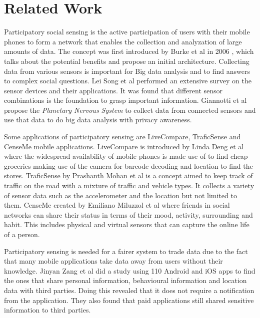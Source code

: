 \chapter{Related Work}

Participatory social sensing is the active participation of users with their mobile phones to form a network that enables the collection and analyzation of large amounts of data.
The concept was first introduced by Burke et al in 2006 \cite{burke2006participatory}, which talks about the potential benefits and propose an initial architecture. Collecting data from various sensors is important for Big data analysis and to find answers to complex social questions. Lei Song et al \cite{song2014health} performed an extensive survey on the sensor devices and their applications. It was found that different sensor combinations is the foundation to grasp important information. Giannotti et al \cite{giannotti2012planetary} propose the \textit{Planetary Nervous System} to collect data from connected sensors and use that data to do big data analysis with privacy awareness.

Some applications of participatory sensing are LiveCompare, TraficSense and CenseMe mobile applications. LiveCompare is introduced by Linda Deng et al
\cite{deng2009livecompare} where the widespread availability of mobile phones is made use of to find cheap groceries making use of the camera for barcode decoding and location to find the stores. TraficSense by Prashanth Mohan et al \cite{mohan2008nericell} is a concept aimed to keep track of traffic on the road with a mixture of traffic and vehicle types. It collects a variety of sensor data such as the accelerometer and the location but not limited to them. CenseMe created by Emiliano Miluzzol et al \cite{miluzzo2007cenceme} where friends in social networks can share their status in terms of their mood, activity, surrounding and habit. This includes physical and virtual sensors that can capture the online life of a person. 

Participatory sensing is needed for a fairer system to trade data due to the fact that many mobile applications take data away from users without their knowledge. Jinyan Zang et al
\cite{zang2015knows} did a study using 110 Android and iOS apps to find the ones that share personal information, behavioural information and location data with third parties. Doing this revealed that it does not require a notification from the application. They also found that paid applications still shared sensitive information to third parties. 

